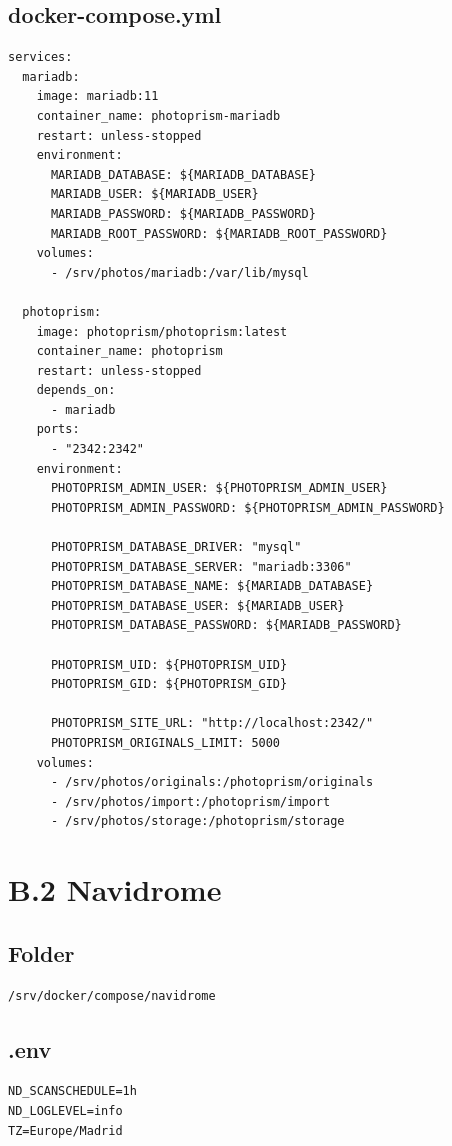 \subsection*{docker-compose.yml}
\begin{lstlisting}
services:
  mariadb:
    image: mariadb:11
    container_name: photoprism-mariadb
    restart: unless-stopped
    environment:
      MARIADB_DATABASE: ${MARIADB_DATABASE}
      MARIADB_USER: ${MARIADB_USER}
      MARIADB_PASSWORD: ${MARIADB_PASSWORD}
      MARIADB_ROOT_PASSWORD: ${MARIADB_ROOT_PASSWORD}
    volumes:
      - /srv/photos/mariadb:/var/lib/mysql

  photoprism:
    image: photoprism/photoprism:latest
    container_name: photoprism
    restart: unless-stopped
    depends_on:
      - mariadb
    ports:
      - "2342:2342"
    environment:
      PHOTOPRISM_ADMIN_USER: ${PHOTOPRISM_ADMIN_USER}
      PHOTOPRISM_ADMIN_PASSWORD: ${PHOTOPRISM_ADMIN_PASSWORD}

      PHOTOPRISM_DATABASE_DRIVER: "mysql"
      PHOTOPRISM_DATABASE_SERVER: "mariadb:3306"
      PHOTOPRISM_DATABASE_NAME: ${MARIADB_DATABASE}
      PHOTOPRISM_DATABASE_USER: ${MARIADB_USER}
      PHOTOPRISM_DATABASE_PASSWORD: ${MARIADB_PASSWORD}

      PHOTOPRISM_UID: ${PHOTOPRISM_UID}
      PHOTOPRISM_GID: ${PHOTOPRISM_GID}

      PHOTOPRISM_SITE_URL: "http://localhost:2342/"
      PHOTOPRISM_ORIGINALS_LIMIT: 5000
    volumes:
      - /srv/photos/originals:/photoprism/originals
      - /srv/photos/import:/photoprism/import
      - /srv/photos/storage:/photoprism/storage
\end{lstlisting}

\section{B.2 Navidrome}
\subsection*{Folder}
\begin{lstlisting}
/srv/docker/compose/navidrome
\end{lstlisting}

\subsection*{.env}
\begin{lstlisting}
ND_SCANSCHEDULE=1h
ND_LOGLEVEL=info
TZ=Europe/Madrid
\end{lstlisting}

